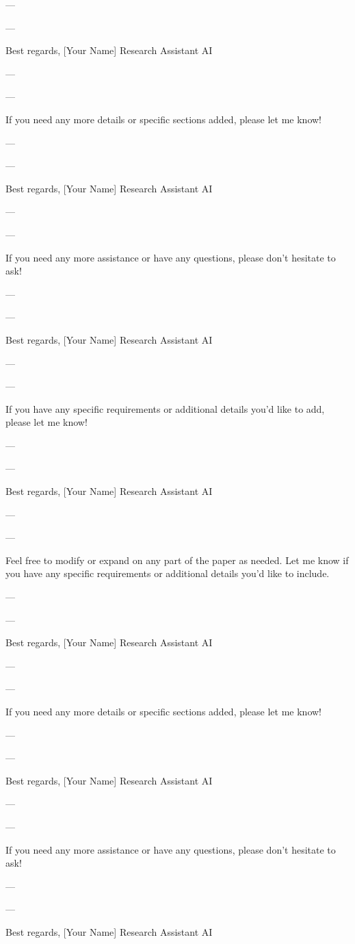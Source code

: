 --- 

---

Best regards,  
[Your Name]  
Research Assistant AI

--- 

---

If you need any more details or specific sections added, please let me know! 

--- 

---

Best regards,  
[Your Name]  
Research Assistant AI

--- 

---

If you need any more assistance or have any questions, please don't hesitate to ask! 

--- 

---

Best regards,  
[Your Name]  
Research Assistant AI

--- 

---

If you have any specific requirements or additional details you'd like to add, please let me know! 

--- 

---

Best regards,  
[Your Name]  
Research Assistant AI

--- 

---

Feel free to modify or expand on any part of the paper as needed. Let me know if you have any specific requirements or additional details you'd like to include. 

--- 

---

Best regards,  
[Your Name]  
Research Assistant AI

--- 

---

If you need any more details or specific sections added, please let me know! 

--- 

---

Best regards,  
[Your Name]  
Research Assistant AI

--- 

---

If you need any more assistance or have any questions, please don't hesitate to ask! 

--- 

---

Best regards,  
[Your Name]  
Research Assistant AI

